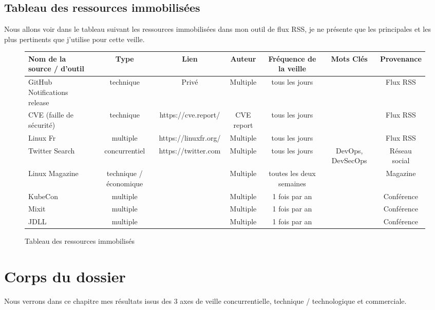 \documentclass[11pt,a4paper,oneside]{book}
\begin{document}
\begin{landscape}

\section{Tableau des ressources immobilisées}

Nous allons voir dans le tableau suivant les ressources immobilisées dans mon outil de flux RSS, je ne présente que les principales et les plus pertinents que j'utilise pour cette veille. \\

\begin{figure}[h]
\begin{tabular}{|l|c|c|c|c|c|c|}
\hline
\rowcolor{gray!30} Nom de la source / d'outil & Type & Lien & Auteur & Fréquence de la veille & Mots Clés & Provenance \\
\hline
GitHub Notifications release & technique & Privé & Multiple & tous les jours & & Flux RSS \\
CVE (faille de sécurité) & technique & https://cve.report/ & CVE report & tous les jours & & Flux RSS \\
Linux Fr & multiple & https://linuxfr.org/ & Multiple & tous les jours & & Flux RSS \\
Twitter Search & concurrentiel & https://twitter.com & Multiple & tous les jours & DevOps, DevSecOps & Réseau social \\
Linux Magazine & technique / économique & & Multiple & toutes les deux semaines & & Magazine \\
KubeCon & multiple & & Multiple & 1 fois par an & & Conférence \\
Mixit & multiple & & Multiple & 1 fois par an & & Conférence \\
JDLL & multiple & & Multiple & 1 fois par an & & Conférence \\
\hline
\end{tabular}
\caption{Tableau des ressources immobilisés}
\end{figure}



\end{landscape}


\chapter{Corps du dossier}

Nous verrons dans ce chapitre mes résultats issus des 3 axes de veille concurrentielle, technique / technologique et commerciale. \\
\end{document}
